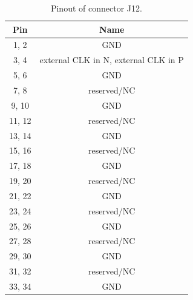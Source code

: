     \begin{table}
    \begin{small}
        \begin{center}
            \begin{tabular}{|c|c|}
                \hline
                Pin & Name\\
                \hline\hline
                1, 2 & GND\\
                \hline
                3, 4 & external CLK in N, external CLK in P\\
                \hline
                5, 6 & GND\\
                \hline
                7, 8 & reserved/NC\\
                \hline
                9, 10 & GND\\
                \hline
                11, 12 & reserved/NC\\
                \hline
                13, 14 & GND\\
                \hline
                15, 16 & reserved/NC\\
                \hline
                17, 18 & GND\\
                \hline
                19, 20 & reserved/NC\\
                \hline
                21, 22 & GND\\
                \hline
                23, 24 & reserved/NC\\
                \hline
                25, 26 & GND\\
                \hline
                27, 28 & reserved/NC\\
                \hline
                29, 30 & GND\\
                \hline
                31, 32 & reserved/NC\\
                \hline
                33, 34 & GND\\
                \hline
            \end{tabular}
            \caption{Pinout of connector J12.}
            \label{J12}
        \end{center}
    \end{small}
    \end{table}

